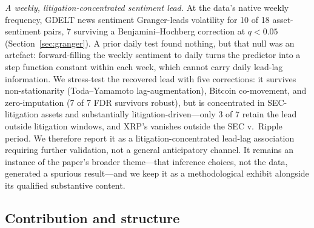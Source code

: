 \documentclass[pdflatex,sn-mathphys-num]{sn-jnl}
\theoremstyle{thmstyleone}
\theoremstyle{thmstyletwo}
\theoremstyle{thmstylethree}
\begin{document}
\emph{A weekly, litigation-concentrated sentiment lead.} At the data's native weekly frequency, GDELT news sentiment Granger-leads volatility for 10 of 18 asset-sentiment pairs, 7 surviving a Benjamini--Hochberg correction at $q<0.05$ (Section~\ref{sec:granger}). A prior daily test found nothing, but that null was an artefact: forward-filling the weekly sentiment to daily turns the predictor into a step function constant within each week, which cannot carry daily lead-lag information. We stress-test the recovered lead with five corrections: it survives non-stationarity (Toda--Yamamoto lag-augmentation), Bitcoin co-movement, and zero-imputation (7 of 7 FDR survivors robust), but is concentrated in SEC-litigation assets and substantially litigation-driven---only 3 of 7 retain the lead outside litigation windows, and XRP's vanishes outside the SEC v.\ Ripple period. We therefore report it as a litigation-concentrated lead-lag association requiring further validation, not a general anticipatory channel. It remains an instance of the paper's broader theme---that inference choices, not the data, generated a spurious result---and we keep it as a methodological exhibit alongside its qualified substantive content.

\subsection{Contribution and structure}
\end{document}
